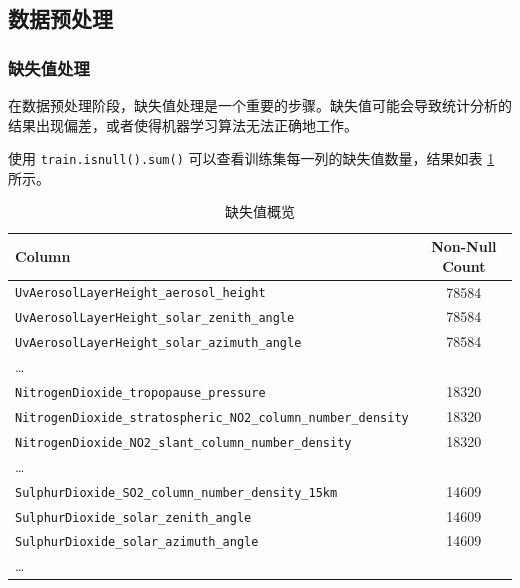 \documentclass{ctexart}
\begin{document}
\subsection{数据预处理}

\subsubsection{缺失值处理}

在数据预处理阶段，缺失值处理是一个重要的步骤。缺失值可能会导致统计分析的结果出现偏差，或者使得机器学习算法无法正确地工作。

使用 \verb|train.isnull().sum()| 可以查看训练集每一列的缺失值数量，结果如表 \ref{tab:1} 所示。

\begin{table}[h]
      \centering
      \caption{缺失值概览}
      \label{tab:1}
      \begin{tabular}{lc}
            \hline
            Column                                                                & Non-Null Count \\ \hline
            \texttt{UvAerosolLayerHeight\_aerosol\_height}                        & 78584          \\
            \texttt{UvAerosolLayerHeight\_solar\_zenith\_angle}                   & 78584          \\
            \texttt{UvAerosolLayerHeight\_solar\_azimuth\_angle}                  & 78584          \\
            \ldots{}                                                              &                \\
            \texttt{NitrogenDioxide\_tropopause\_pressure}                        & 18320          \\
            \texttt{NitrogenDioxide\_stratospheric\_NO2\_column\_number\_density} & 18320          \\
            \texttt{NitrogenDioxide\_NO2\_slant\_column\_number\_density}         & 18320          \\
            \ldots{}                                                              &                \\
            \texttt{SulphurDioxide\_SO2\_column\_number\_density\_15km}           & 14609          \\
            \texttt{SulphurDioxide\_solar\_zenith\_angle}                         & 14609          \\
            \texttt{SulphurDioxide\_solar\_azimuth\_angle}                        & 14609          \\
            \ldots{}                                                              &                \\
            \hline
      \end{tabular}
\end{table}
\end{document}
